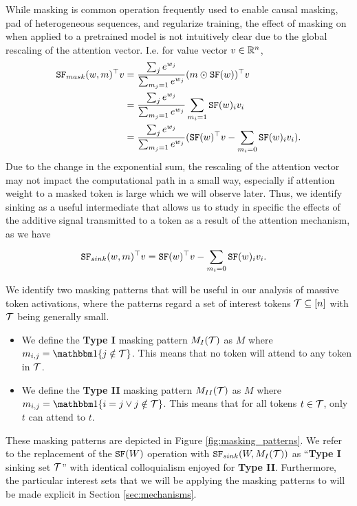 \documentclass[10pt,twocolumn,letterpaper]{article}
\begin{document}
While masking is common operation frequently used to enable causal masking, pad of heterogeneous sequences, and regularize training, the effect of masking on when applied to a pretrained model is not intuitively clear due to the global rescaling of the attention vector. I.e. for value vector $v \in \R^n$, \begin{align}
    \tr{\sfm(w, m)}v
    & = \frac{\dss{j}{} e^{w_j}}{\dss{m_j = 1}{} e^{w_j}} \tr{(m \odot \sf(w))}v   \\
    & = \frac{\dss{j}{} e^{w_j}}{\dss{m_j = 1}{} e^{w_j}} \dss{m_i = 1}{} \sf(w)_iv_i    \\
    & = \frac{\dss{j}{} e^{w_j}}{\dss{m_j = 1}{} e^{w_j}} (\tr{\sf(w)}v - \dss{m_i = 0}{} \sf(w)_iv_i).
\end{align} Due to the change in the exponential sum, the rescaling of the attention vector may not impact the computational path in a small way, especially if attention weight to a masked token is large which we will observe later. Thus, we identify sinking as a useful intermediate that allows us to study in specific the effects of the additive signal transmitted to a token as a result of the attention mechanism, as we have \begin{align}
    \tr{\sfs(w, m)}v
    & = \tr{\sf(w)}v - \dss{m_i = 0}{} \sf(w)_iv_i.
\end{align}

We identify two masking patterns that will be useful in our analysis of massive token activations, where the patterns regard a set of interest tokens $\mc{T} \subseteq [n]$ with $\mc{T}$ being generally small. \begin{itemize}
    \item We define the \textbf{Type I} masking pattern $M_I(\mc{T})$ as $M$ where $m_{i, j} = \indic{j \notin \mc{T}}$. This means that no token will attend to any token in $\mc{T}$.



    \item We define the \textbf{Type II} masking pattern $M_{II}(\mc{T})$ as $M$ where $m_{i, j} = \indic{i = j \lor j \notin \mc{T}}$. This means that for all tokens $t \in \mc{T}$, only $t$ can attend to $t$.
\end{itemize}
These masking patterns are depicted in Figure \ref{fig:masking_patterns}. We refer to the replacement of the $\sf(W)$ operation with $\sfs(W, M_I(\mc{T}))$ as ``\textbf{Type I} sinking set $\mc{T}$'' with identical colloquialism enjoyed for \textbf{Type II}. Furthermore, the particular interest sets that we will be applying the masking patterns to will be made explicit in Section \ref{sec:mechanisms}.
\end{document}
